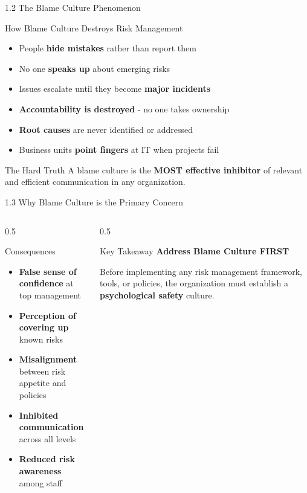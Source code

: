 \documentclass{beamer}
\begin{document}
	\begin{frame}{1.2 The Blame Culture Phenomenon}
		\begin{block}{How Blame Culture Destroys Risk Management}
			\begin{itemize}
				\item People \textbf{hide mistakes} rather than report them
				\item No one \textbf{speaks up} about emerging risks
				\item Issues escalate until they become \textbf{major incidents}
				\item \textbf{Accountability is destroyed} - no one takes ownership
				\item \textbf{Root causes} are never identified or addressed
				\item Business units \textbf{point fingers} at IT when projects fail
			\end{itemize}
		\end{block}
		
		\begin{alertblock}{The Hard Truth}
			A blame culture is the \textbf{MOST effective inhibitor} of relevant and efficient communication in any organization.
		\end{alertblock}
	\end{frame}
	
	\begin{frame}{1.3 Why Blame Culture is the Primary Concern}
		\begin{columns}
			\begin{column}{0.5\textwidth}
				\begin{block}{Consequences}
					\begin{itemize}
						\item \textbf{False sense of confidence} at top management
						\item \textbf{Perception of covering up} known risks
						\item \textbf{Misalignment} between risk appetite and policies
						\item \textbf{Inhibited communication} across all levels
						\item \textbf{Reduced risk awareness} among staff
					\end{itemize}
				\end{block}
			\end{column}
			\begin{column}{0.5\textwidth}
				\begin{exampleblock}{Key Takeaway}
					\centering
					\Large{\textbf{Address Blame Culture FIRST}}
					
					\vspace{0.3cm}
					\normalsize{Before implementing any risk management framework, tools, or policies, the organization must establish a \textbf{psychological safety} culture.}
				\end{exampleblock}
			\end{column}
		\end{columns}
	\end{frame}
	
\end{document}
